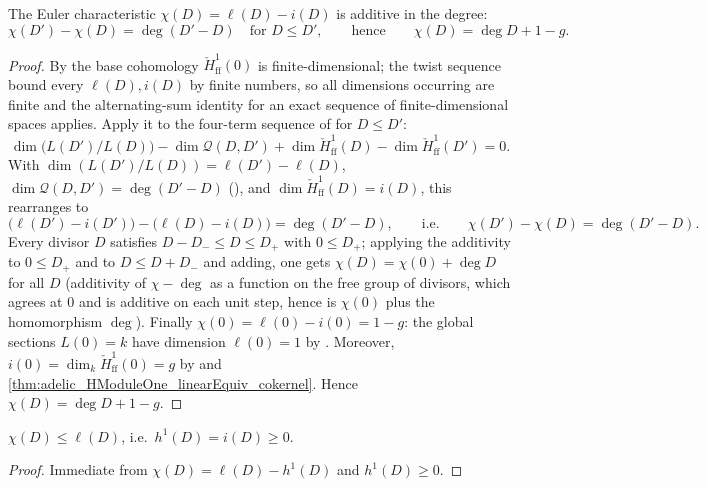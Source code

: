 \begin{theorem}
  \label{thm:adelic_chi_eq_chi_zero_add_degree}
  The Euler characteristic \(\chi(D) = \ell(D) - i(D)\) is additive in the
  degree:
  \[
    \chi(D') - \chi(D) = \deg(D' - D)
    \quad\text{for } D \le D',
    \qquad\text{hence}\qquad
    \chi(D) = \deg D + 1 - g .
  \]
\end{theorem}
\begin{proof}
  By  the base cohomology
  \(\check{H}^1_{\mathrm{ff}}(0)\) is finite-dimensional; the twist sequence
  bound every \(\ell(D), i(D)\) by finite numbers, so all dimensions
  occurring are finite and the alternating-sum identity for an exact
  sequence of finite-dimensional spaces applies. Apply it to the
  four-term sequence of  for
  \(D \le D'\):
  \[
    \dim\!\bigl(L(D')/L(D)\bigr) - \dim \mathcal{Q}(D, D')
      + \dim \check{H}^1_{\mathrm{ff}}(D)
      - \dim \check{H}^1_{\mathrm{ff}}(D') = 0 .
  \]
  With \(\dim(L(D')/L(D)) = \ell(D') - \ell(D)\),
  \(\dim \mathcal{Q}(D, D') = \deg(D' - D)\)
  (), and
  \(\dim \check{H}^1_{\mathrm{ff}}(D) = i(D)\), this rearranges to
  \[
    \bigl(\ell(D') - i(D')\bigr) - \bigl(\ell(D) - i(D)\bigr)
      = \deg(D' - D),
    \qquad\text{i.e.}\qquad \chi(D') - \chi(D) = \deg(D' - D).
  \]
  Every divisor \(D\) satisfies \(D - D_- \le D \le D_+\) with
  \(0 \le D_+\); applying the additivity to \(0 \le D_+\) and to
  \(D \le D + D_-\) and adding, one gets \(\chi(D) = \chi(0) + \deg D\)
  for all \(D\) (additivity of \(\chi - \deg\) as a function on the free
  group of divisors, which agrees at \(0\) and is additive on each unit
  step, hence is \(\chi(0)\) plus the homomorphism \(\deg\)). Finally
  \(\chi(0) = \ell(0) - i(0) = 1 - g\): the global sections
  \(L(0)=k\) have dimension \(\ell(0)=1\) by
  .  Moreover,
  \(i(0)=\dim_k\check H^1_{\mathrm{ff}}(0)=g\) by
   and
  \cref{thm:adelic_HModuleOne_linearEquiv_cokernel}. Hence
  \(\chi(D) = \deg D + 1 - g\).
\end{proof}

\begin{lemma}
  \label{lem:adelic_chi_le_ell}
  \leanok
  \(\chi(D) \le \ell(D)\), i.e.\ \(h^1(D) = i(D) \ge 0\).
\end{lemma}
\begin{proof}
  \leanok
  Immediate from \(\chi(D) = \ell(D) - h^1(D)\) and \(h^1(D) \ge 0\).
\end{proof}

